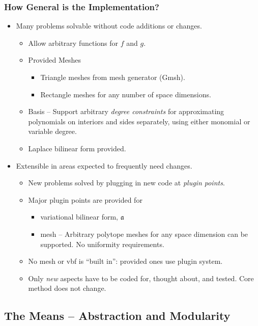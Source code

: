 \documentclass{beamer}
\begin{document}
\begin{frame}
  \frametitle{How General is the Implementation?}
  \pause
  \begin{itemize}[<+->]
    \item Many problems solvable without code additions or changes.
      \begin{itemize}[<+->]
        \item Allow arbitrary functions for $f$ and $g$.
        \item Provided Meshes
          \begin{itemize}
            \item Triangle meshes from mesh generator (Gmsh).
            \item Rectangle meshes for any number of space dimensions.
          \end{itemize}
        \item Basis -- Support arbitrary \emph{degree constraints} for approximating polynomials on interiors and sides separately,
          using either monomial or variable degree.
        \item Laplace bilinear form provided. 
      \end{itemize}
    \item Extensible in areas expected to frequently need changes.
      \begin{itemize}
        \item New problems solved by plugging in new code at \emph{plugin points}.
        \item Major plugin points are provided for
          \begin{itemize}
            \item variational bilinear form, $\mathfrak{a}$
            \item mesh -- Arbitrary polytope meshes for any space dimension can be supported. No uniformity requirements.
          \end{itemize}
        \item No mesh or vbf is ``built in'': provided ones use plugin system.
        \item Only \emph{new} aspects have to be coded for, thought about, and tested. Core method does not change.
      \end{itemize}
  \end{itemize}
\end{frame}

\subsection{The Means -- Abstraction and Modularity}
\end{document}
